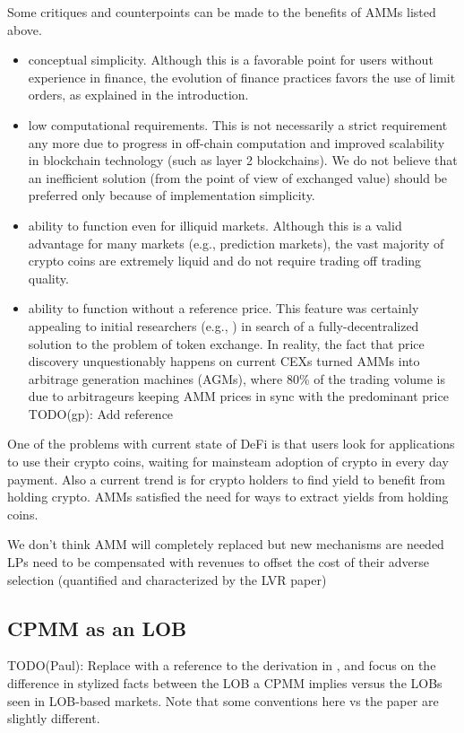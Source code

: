 \documentclass[11pt, reqno]{amsart}
\theoremstyle{definition}
\theoremstyle{remark}
\begin{document}
Some critiques and counterpoints can be made to the benefits of AMMs listed above.
\begin{itemize}
	\item conceptual simplicity. Although this is a favorable point for users
	      without experience in finance, the evolution of finance practices favors the
	      use of limit orders, as explained in the introduction.
	\item low computational requirements. This is not necessarily a strict
	      requirement any more due to progress in off-chain computation and
          improved scalability in blockchain technology (such as layer 2
          blockchains). We do not believe that an inefficient solution (from
          the point of view of exchanged value) should be preferred only
          because of implementation simplicity.
	\item ability to function even for illiquid markets.
	      Although this is a valid advantage for many markets (e.g., prediction markets),
	      the vast majority of crypto coins are extremely liquid and do not require
	      trading off trading quality.
	\item ability to function without a reference price.
          This feature was certainly appealing to initial researchers (e.g., \cite{Bu17})
	      in search of a fully-decentralized solution to the problem
	      of token exchange. In reality, the fact that price discovery unquestionably
	      happens on current CEXs turned AMMs into arbitrage generation machines
	      (AGMs), where 80\% of the trading volume is due to arbitrageurs keeping AMM
	      prices in sync with the predominant price TODO(gp): Add reference
\end{itemize}

One of the problems with current state of DeFi is that users look for
applications to use their crypto coins, waiting for mainsteam adoption of
crypto in every day payment.
Also a current trend is for crypto holders to find yield to benefit from
holding crypto. AMMs satisfied the need for ways to extract yields from holding
coins.

We don't think AMM will completely replaced but new mechanisms are needed LPs
need to be compensated with revenues to offset the cost of their adverse
selection (quantified and characterized by the LVR paper)

\subsection{CPMM as an LOB}
TODO(Paul): Replace with a reference to the derivation in \cite{Yo20}, and
focus on the difference in stylized facts between the LOB a CPMM implies
versus the LOBs seen in LOB-based markets. Note that some conventions here
vs the paper are slightly different.
\end{document}
